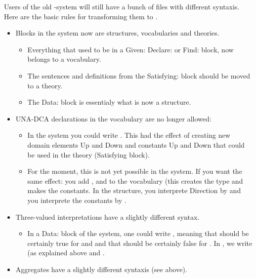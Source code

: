 Users of the old \idptwo-system will still have a bunch of files with different syntaxis. Here are the basic rules for transforming them to \idpthree.
\begin{itemize}
	\item Blocks in the \idptwo system now are structures, vocabularies and theories.
		\begin{itemize}
			\item Everything that used to be in a Given: Declare: or Find: block, now belongs to a vocabulary.
			\item The sentences and definitions from the Satisfying: block should be moved to a theory.
			\item The Data: block is essentialy what is now a structure.
		\end{itemize}
	\item UNA-DCA declarations in the vocabulary are no longer allowed:
		\begin{itemize}
			\item In the \idptwo system you could write . This had the effect of creating new domain elements Up and Down and constants Up and Down that could be used in the theory (Satisfying block).
			\item For the moment, this is not yet possible in the \idpthree system. If you want the same effect: you add ,  and  to the vocabulary (this creates the type and makes the constants. In the structure, you interprete Direction by  and you interprete the constants by .
		\end{itemize}
	\item Three-valued interpretations have a slightly different syntax.
		\begin{itemize}
			\item In a Data: block of the \idptwo system, one could write , meaning that  should be certainly true for  and  and that  should be certainly false for . In \idpthree, we write (as explained above  and .
		\end{itemize}
	\item Aggregates have a slightly different syntaxis (see above).


\end{itemize}